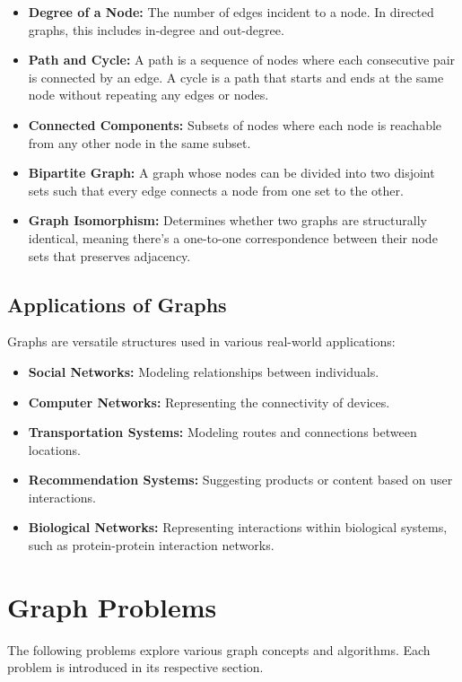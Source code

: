 \begin{itemize}
    \item \textbf{Degree of a Node:} The number of edges incident to a node. In directed graphs, this includes in-degree and out-degree.
    
    \item \textbf{Path and Cycle:} A path is a sequence of nodes where each consecutive pair is connected by an edge. A cycle is a path that starts and ends at the same node without repeating any edges or nodes.
    
    \item \textbf{Connected Components:} Subsets of nodes where each node is reachable from any other node in the same subset.
    
    \item \textbf{Bipartite Graph:} A graph whose nodes can be divided into two disjoint sets such that every edge connects a node from one set to the other.
    
    \item \textbf{Graph Isomorphism:} Determines whether two graphs are structurally identical, meaning there's a one-to-one correspondence between their node sets that preserves adjacency.
\end{itemize}

\subsection*{Applications of Graphs}
Graphs are versatile structures used in various real-world applications:

\begin{itemize}
    \item \textbf{Social Networks:} Modeling relationships between individuals.
    
    \item \textbf{Computer Networks:} Representing the connectivity of devices.
    
    \item \textbf{Transportation Systems:} Modeling routes and connections between locations.
    
    \item \textbf{Recommendation Systems:} Suggesting products or content based on user interactions.
    
    \item \textbf{Biological Networks:} Representing interactions within biological systems, such as protein-protein interaction networks.
\end{itemize}

\section*{Graph Problems}
The following problems explore various graph concepts and algorithms. Each problem is introduced in its respective section.

\printindex